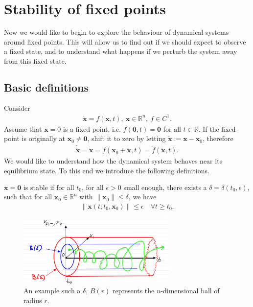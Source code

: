 \chapter{Stability of fixed points}
Now we would like to begin to explore the behaviour of dynamical systems around fixed points. This will allow us to find out if we should expect to observe a fixed state, and to understand what happens if we perturb the system away from this fixed state.
\section{Basic definitions}
Consider
\begin{align}
	\dot{ \bm{x}}=f( \bm{x},t),\  \bm{x} \in \mathbb{R}^{n},\ f\in C^{1}.
\end{align}
Assume that $ \bm{x}=0$ is a fixed point, i.e. $f(\bm{0},t) = \bm{0}$ for all $t \in \mathbb{R}$. If the fixed point is originally at $\bm{x}_0\neq \bm{0}$, shift it to zero by letting $\tilde{ \bm{x}}:= \bm{x}- \bm{x}_0$, therefore 
\begin{align}
	\dot{\tilde{ \bm{x}}} = \dot{ \bm{x}} = f( \bm{x}_0 + \tilde{ \bm{x}}, t) = \tilde{f}(\tilde{ \bm{x}}, t).
\end{align}
We would like to understand how the dynamical system behaves near its equilibrium state. To this end we introduce the following definitions.
\begin{definition}
	$ \bm{x}=\bm{0}$ is stable if for all $t_0$, for all $\epsilon>0$ small enough, there exists a $\delta=\delta(t_0, \epsilon)$, such that for all $ \bm{x}_0 \in \mathbb{R}^{n}$ with $\| \bm{x}_0\| \leq \delta$, we have 
	\begin{align}
		\left \|  \bm{x}(t;t_0,  \bm{x}_0) \right\| \leq \epsilon \quad \forall t \geq t_0.
	\end{align}
\begin{figure}[h!]
	\centering
	\includegraphics[width=0.7\textwidth]{figures/ch2/1lyapunov_stability.png}
	\caption{An example such a $\delta$, $B(r)$ represents the $n$-dimensional ball of radius $r$.}
	\label{fig:lyapunov_stability_def}
\end{figure}
\end{definition}

